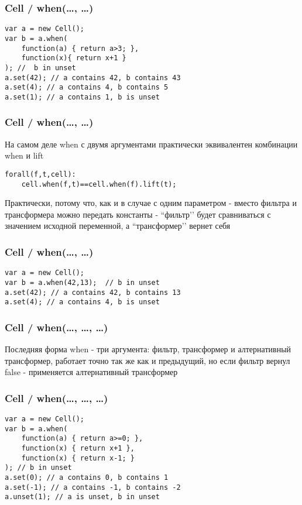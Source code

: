 \documentclass[xetex]{beamer}
\begin{document}
\begin{frame}[fragile]
\frametitle{Cell / when(\dots, \dots)}
\begin{lstlisting}
var a = new Cell();
var b = a.when(
    function(a) { return a>3; }, 
    function(x){ return x+1 }
); //  b in unset
a.set(42); // a contains 42, b contains 43
a.set(4); // a contains 4, b contains 5
a.set(1); // a contains 1, b is unset
\end{lstlisting}
\end{frame}


\begin{frame}[fragile]
\frametitle{Cell / when(\dots, \dots)}
На самом деле when с двумя аргументами практически эквивалентен комбинации when и lift

\vspace{4mm}
\begin{lstlisting}
forall(f,t,cell):
    cell.when(f,t)==cell.when(f).lift(t);
\end{lstlisting}
\vspace{4mm}
Практически, потому что, как и в случае с одним параметром - вместо фильтра и трансформера можно передать константы - ``фильтр’’ будет сравниваться с значением исходной переменной, а ``трансформер’’ вернет себя
\end{frame}


\begin{frame}[fragile]
\frametitle{Cell / when(\dots, \dots)}
\begin{lstlisting}
var a = new Cell();
var b = a.when(42,13);  // b in unset
a.set(42); // a contains 42, b contains 13
a.set(4); // a contains 4, b is unset
\end{lstlisting}
\end{frame}


\begin{frame}[fragile]
\frametitle{Cell / when(\dots, \dots, \dots)}
Последняя форма when - три аргумента: фильтр, трансформер и алтернативный трансформер, работает точно так же как и предыдущий, но если фильтр вернул false - применяется алтернативный трансформер
\end{frame}


\begin{frame}[fragile]
\frametitle{Cell / when(\dots, \dots, \dots)}
\begin{lstlisting}
var a = new Cell();
var b = a.when(
    function(a) { return a>=0; }, 
    function(x) { return x+1 },
    function(x) { return x-1; }
); // b in unset
a.set(0); // a contains 0, b contains 1
a.set(-1); // a contains -1, b contains -2
a.unset(1); // a is unset, b in unset
\end{lstlisting}
\end{frame}
\end{document}
